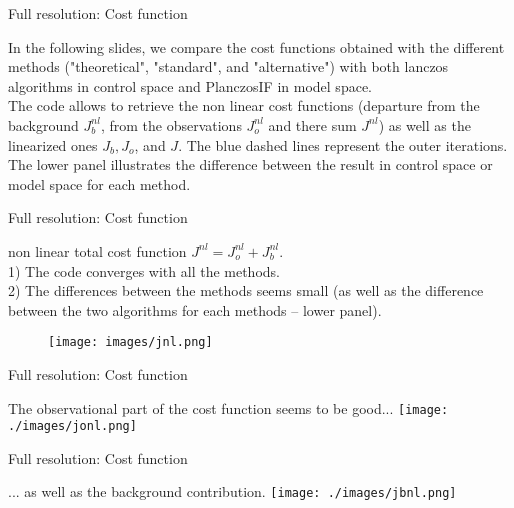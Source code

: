 \documentclass[francais]{beamer}
\begin{document}
\begin{frame}{Full resolution: Cost function}
\begin{center}
In the following slides, we compare the cost functions obtained with the different methods ("theoretical", "standard", and "alternative") with both lanczos algorithms in control space and PlanczosIF in model space.\\
\vspace{+1cm}
The code allows to retrieve the non linear cost functions (departure from the background $J^{nl}_b$, from the observations $J^{nl}_o$ and there sum $J^{nl}$) as well as the linearized ones $J_b,J_o$, and $J$.
\vspace{+1cm}
The blue dashed lines represent the outer iterations. The lower panel illustrates the difference between the result in control space or model space for each method.\\
\end{center}
\end{frame}

\begin{frame}{Full resolution: Cost function}
\begin{center}
non linear total cost function $J^{nl}=J^{nl}_o + J^{nl}_b$.\\
1) The code converges with all the methods.\\
2) The differences between the methods seems small (as well as the difference between the two algorithms for each methods -- lower panel).\\
\endminipage \hfill
{}%
\begin{figure}
  \texttt{[image: images/jnl.png]}
\end{figure}
\endminipage
\end{center}
\end{frame}


\begin{frame}{Full resolution: Cost function}
\begin{center}
The observational part of the cost function seems to be good...
 \texttt{[image: ./images/jonl.png]}
\end{center}
\end{frame}

\begin{frame}{Full resolution: Cost function}
\begin{center}
... as well as the background contribution.
 \texttt{[image: ./images/jbnl.png]}
\end{center}
\end{frame}
\end{document}
